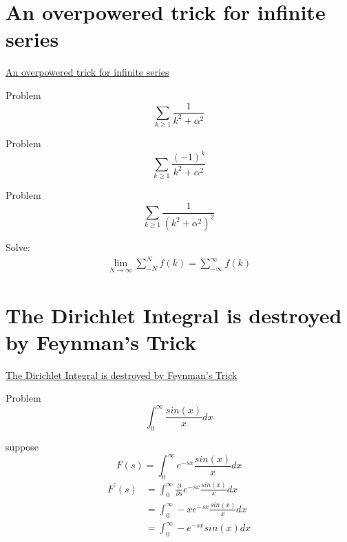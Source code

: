 \documentclass {article}
\begin{document}
\section{An overpowered trick for infinite series}
\href{https://www.youtube.com/watch?v=gd7FmQAVNmk}{An overpowered trick for infinite series}

Problem \[ \sum_{k \ge 1} \frac{1}{k^{2} + \alpha^{2}} \]

Problem \[ \sum_{k \ge 1} \frac{\left (-1\right)^k}{k^{2} + \alpha^{2}}\]

Problem \[ \sum_{k \ge 1} \frac{1}{\left(k^{2} + \alpha^{2}\right)^2}\]


Solve:\\
\[
\begin{matrix}
 \lim\limits_{N \to \infty}\displaystyle\sum_{-N}^{N}f(k) = \displaystyle\sum_{-\infty}^{\infty} f(k)
\end{matrix}
\]


\section{The Dirichlet Integral is destroyed by Feynman's Trick}
\href{https://www.youtube.com/watch?v=ZZccxuOpb4k}{The Dirichlet Integral is destroyed by Feynman's Trick}

Problem \[ \int_{0}^{\infty} \frac {sin\left(x\right)}{x} {d}x \]

suppose \[ F\left(s\right) = \int_{0}^{\infty} e^{-sx}\frac{sin(x)}{x} {d}x\]
\[
\begin{matrix}
 F^{'}(s)  & = \int_{0}^{\infty} \frac{\partial}{\partial{s}} e^{-sx}\frac{sin(x)}{x} {d}x  \\
           & = \int_{0}^{\infty} -xe^{-sx} \frac{sin(x)}{x} {d}x  \\
           & = \int_{0}^{\infty} -e^{-sx} sin(x) {d}x
\end{matrix}
\]
\end{document}
